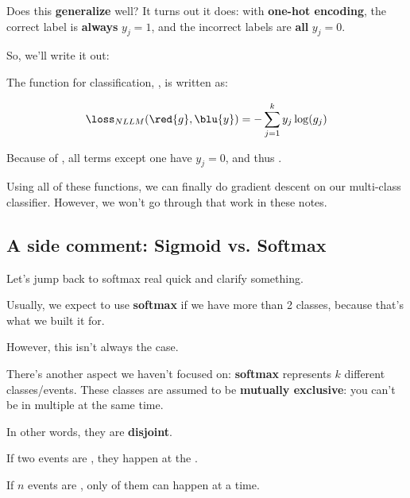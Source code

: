         Does this \textbf{generalize} well? It turns out it does: with \textbf{one-hot encoding}, the correct label is \textbf{always} $y_j=1$, and the incorrect labels are \textbf{all} $y_j=0$. 
        
        So, we'll write it out:\\
        
        \begin{kequation}
            The  function for  classification, , is written as:
            
            \begin{equation*}
                \loss_{NLLM}
                (\red{g} , \blu{y})
                =
                -\sum_{j=1}^k
                y_j \log(g_j)
            \end{equation*}
            
            Because of , all terms except one have $y_j=0$, and thus .
        \end{kequation}
        
        Using all of these functions, we can finally do gradient descent on our multi-class classifier. However, we won't go through that work in these notes.

    \subsection{A side comment: Sigmoid vs. Softmax}

            Let's jump back to softmax real quick and clarify something.

            Usually, we expect to use \textbf{softmax} if we have more than 2 classes, because that's what we built it for.

            However, this isn't always the case. 
            
            There's another aspect we haven't focused on: \textbf{softmax} represents $k$ different classes/events. These classes are assumed to be \textbf{mutually exclusive}: you can't be in multiple at the same time.

            In other words, they are \textbf{disjoint}.\\

            \begin{definition}
                If two events are , they  happen at the .

                If $n$ events are , only  of them can happen at a time.
            \end{definition}


